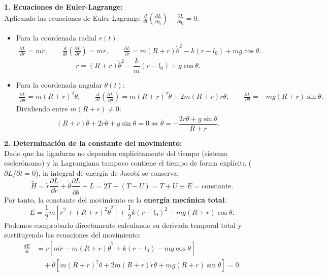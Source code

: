 \documentclass[11pt,a4paper]{article}
\begin{document}
\textbf{1. Ecuaciones de Euler-Lagrange:}\\
Aplicando las ecuaciones de Euler-Lagrange $\frac{d}{dt}\left(\frac{\partial L}{\partial \dot{q}_i}\right) - \frac{\partial L}{\partial q_i} = 0$:
\begin{itemize}
    \item Para la coordenada radial $r(t)$:
    \begin{align*}
    \frac{\partial L}{\partial \dot{r}} = m\dot{r}, \qquad \frac{d}{dt}\left(\frac{\partial L}{\partial \dot{r}}\right) = m\ddot{r}, \qquad \frac{\partial L}{\partial r} = m(R + r)\dot{\theta}^2 - k(r - l_0) + mg\cos\theta.
    \end{align*}
    \begin{equation}
    \boxed{\ddot{r} = (R + r)\dot{\theta}^2 - \frac{k}{m}(r - l_0) + g\cos\theta.} \label{eq:el_r}
    \end{equation}
    
    \item Para la coordenada angular $\theta(t)$:
    \begin{align*}
    \frac{\partial L}{\partial \dot{\theta}} = m(R + r)^2\dot{\theta}, \qquad \frac{d}{dt}\left(\frac{\partial L}{\partial \dot{\theta}}\right) = m(R + r)^2\ddot{\theta} + 2m(R + r)\dot{r}\dot{\theta}, \qquad \frac{\partial L}{\partial \theta} = -mg(R + r)\sin\theta.
    \end{align*}
    Dividiendo entre $m(R + r) \neq 0$:
    \begin{equation}
    \boxed{(R + r)\ddot{\theta} + 2\dot{r}\dot{\theta} + g\sin\theta = 0 \iff \ddot{\theta} = -\frac{2\dot{r}\dot{\theta} + g\sin\theta}{R + r}.} \label{eq:el_th}
    \end{equation}
\end{itemize}

\textbf{2. Determinación de la constante del movimiento:}\\
Dado que las ligaduras no dependen explícitamente del tiempo (sistema esclerónomo) y la Lagrangiana tampoco contiene el tiempo de forma explícita ($\partial L/\partial t = 0$), la integral de energía de Jacobi se conserva:
\begin{equation}
\tilde{H} = \dot{r}\frac{\partial L}{\partial \dot{r}} + \dot{\theta}\frac{\partial L}{\partial \dot{\theta}} - L = 2T - (T - U) = T + U \equiv E = \text{constante}.
\end{equation}
Por tanto, la constante del movimiento es la \textbf{energía mecánica total}:
\begin{equation}
\boxed{E = \frac{1}{2}m\left[ \dot{r}^2 + (R + r)^2\dot{\theta}^2 \right] + \frac{1}{2}k(r - l_0)^2 - mg(R + r)\cos\theta.}
\end{equation}
Podemos comprobarlo directamente calculando su derivada temporal total y sustituyendo las ecuaciones del movimiento:
\begin{align*}
\frac{dE}{dt} &= \dot{r}\left[m\ddot{r} - m(R+r)\dot{\theta}^2 + k(r-l_0) - mg\cos\theta\right] \\
&\quad + \dot{\theta}\left[m(R+r)^2\ddot{\theta} + 2m(R+r)\dot{r}\dot{\theta} + mg(R+r)\sin\theta\right] = 0.
\end{align*}
\end{document}
